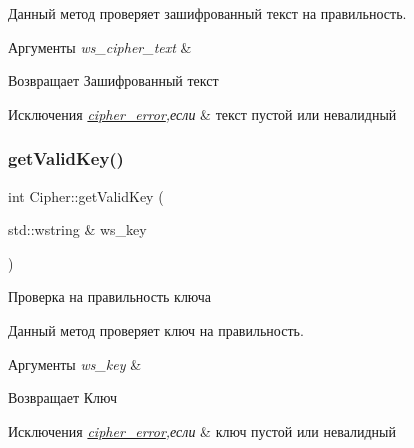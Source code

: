 Данный метод проверяет зашифрованный текст на правильность.


\begin{DoxyParams}{Аргументы}
{\em ws\+\_\+cipher\+\_\+text} & \\
\hline
\end{DoxyParams}
\begin{DoxyReturn}{Возвращает}
Зашифрованный текст 
\end{DoxyReturn}

\begin{DoxyExceptions}{Исключения}
{\em \hyperlink{classcipher__error}{cipher\+\_\+error},если} & текст пустой или невалидный \\
\hline
\end{DoxyExceptions}
\mbox{\label{classCipher_aec5962319726c6dd1bd6ee2f7b71e001}} 
\subsubsection{\texorpdfstring{get\+Valid\+Key()}{getValidKey()}}
{\footnotesize\ttfamily int Cipher\+::get\+Valid\+Key (\begin{DoxyParamCaption}\item[{std\+::wstring \&}]{ws\+\_\+key }\end{DoxyParamCaption})\hspace{0.3cm}{\ttfamily [inline]}}



Проверка на правильность ключа 

Данный метод проверяет ключ на правильность.


\begin{DoxyParams}{Аргументы}
{\em ws\+\_\+key} & \\
\hline
\end{DoxyParams}
\begin{DoxyReturn}{Возвращает}
Ключ 
\end{DoxyReturn}

\begin{DoxyExceptions}{Исключения}
{\em \hyperlink{classcipher__error}{cipher\+\_\+error},если} & ключ пустой или невалидный \\
\hline
\end{DoxyExceptions}
\mbox{\label{classCipher_a0dc9d7c13d6a7401bfee1f1171f6ee12}} 
